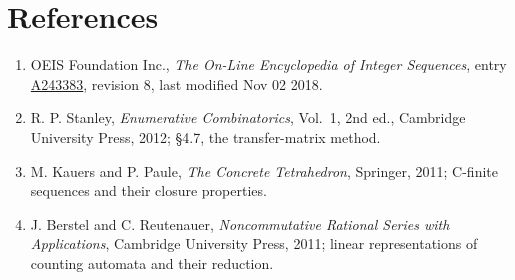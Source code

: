 \documentclass[11pt]{article}
\theoremstyle{definition}
\begin{document}
\section{References}

\begin{enumerate}

\item OEIS Foundation Inc., \emph{The On-Line Encyclopedia of Integer Sequences}, entry \href{https://oeis.org/A243383}{A243383}, revision 8, last modified Nov 02 2018.

\item R. P. Stanley, \emph{Enumerative Combinatorics}, Vol.~1, 2nd ed., Cambridge University Press, 2012; \S4.7, the transfer-matrix method.

\item M. Kauers and P. Paule, \emph{The Concrete Tetrahedron}, Springer, 2011; C-finite sequences and their closure properties.

\item J. Berstel and C. Reutenauer, \emph{Noncommutative Rational Series with Applications}, Cambridge University Press, 2011; linear representations of counting automata and their reduction.

\end{enumerate}
\end{document}
